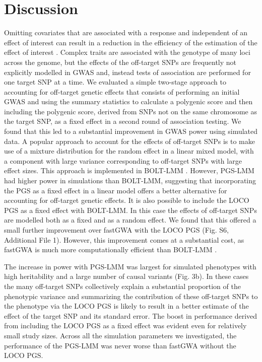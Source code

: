 \documentclass[doublespacing]{bmcart}
\begin{document}
\section*{Discussion}
Omitting covariates that are associated with a response and independent of an effect of interest can result in a reduction in the efficiency of the estimation of the effect of interest \cite{neuhaus1998estimation}. Complex traits are associated with the genotype of many loci across the genome, but the effects of the off-target SNPs are frequently not explicitly modelled in GWAS and, instead tests of association are performed for one target SNP at a time. We evaluated a simple two-stage approach to accounting for off-target genetic effects that consists of performing an initial GWAS and using the summary statistics to calculate a polygenic score and then including the polygenic score, derived from SNPs not on the same chromosome as the target SNP, as a fixed effect in a second round of association testing. We found that this led to a substantial improvement in GWAS power using simulated data. A popular approach to account for the effects of off-target SNPs is to make use of a mixture distribution for the random effect in a linear mixed model, with a component with large variance corresponding to off-target SNPs with large effect sizes. This approach is implemented in BOLT-LMM \cite{BOLT}. However, PGS-LMM had higher power in simulations than BOLT-LMM, suggesting that incorporating the PGS as a fixed effect in a linear model offers a better alternative for accounting for off-target genetic effects. It is also possible to include the LOCO PGS as a fixed effect with BOLT-LMM. In this case the effects of off-target SNPs are modelled both as a fixed and as a random effect. We found that this offered a small further improvement over fastGWA with the LOCO PGS (Fig. S6, Additional File 1). However, this improvement comes at a substantial cost, as fastGWA is much more computationally efficient than BOLT-LMM \cite{jiang2019resource}. 

The increase in power with PGS-LMM was largest for simulated phenotypes with high heritability and a large number of causal variants (Fig. 3b). In these cases the many off-target SNPs collectively explain a substantial proportion of the phenotypic variance and summarizing the contribution of these off-target SNPs to the phenotype via the LOCO PGS is likely to result in a better estimate of the effect of the target SNP and its standard error. The boost in performance derived from including the LOCO PGS as a fixed effect was evident even for relatively small study sizes. Across all the simulation parameters we investigated, the performance of the PGS-LMM was never worse than fastGWA without the LOCO PGS. 
\end{document}
